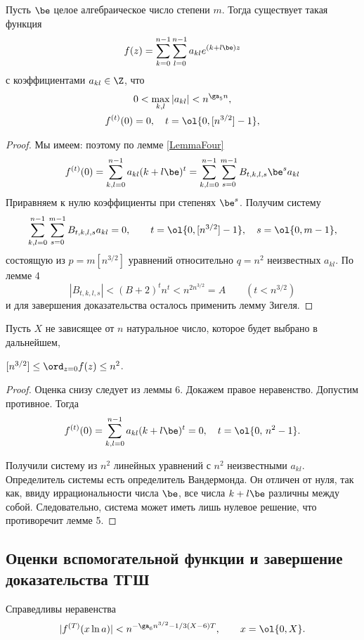 \documentclass{article}
\begin{document}
\begin{lemma}
Пусть $\be$  целое алгебраическое число степени $m$.
Тогда существует такая функция
$$
f(z)=\sum_{k=0}^{n-1} \sum_{l=0}^{n-1} a_{kl} e^{(k+l\be)z}
$$
с коэффициентами $a_{kl} \in \Z$, что
\begin{gather}
0 < \max_{k,l} |a_{kl}| < n^{\ga_5n}, \\
f^{(t)}(0)=0, \quad t= \ol {0,[n^{3/2}]-1},
\end{gather}
\end{lemma}
\begin{proof}
Мы имеем:
поэтому по лемме \ref{LemmaFour}
$$
f^{(t)}(0)=\sum_{k,l=0}^{n-1}a_{kl}(k+l\be)^t=
\sum_{k,l=0}^{n-1}\sum_{s=0}^{m-1}B_{t,k,l,s}\be^sa_{kl}
$$
Приравняем к нулю коэффициенты при степенях $\be^s$. Получим систему
$$
\sum_{k,l=0}^{n-1}\sum_{s=0}^{m-1}B_{t,k,l,s}a_{kl}=0, \qquad
t=\ol{0,[n^{3/2}]-1}, \quad s=\ol{0,m-1},
$$
состоящую из $p=m[n^{3/2}]$   уравнений относительно $q=n^2$
неизвестных $a_{kl}$.  По лемме 4
$$
|B_{t,k,l,s}|<(B+2)^tn^t<n^{2n^{3/2}}=A \qquad (t<n^{3/2})
$$
и для завершения доказательства осталось применить лемму Зигеля.
\end{proof}

Пусть $X$  не зависящее от $n$ натуральное число,
которое будет выбрано в дальнейшем,
\begin{lemma}
$[n^{3/2}] \le \ord_{z=0}f(z) \le n^2$.
\end{lemma}
\begin{proof}
Оценка снизу следует из леммы 6. Докажем правое
неравенство. Допустим противное. Тогда
$$
f^{(t)}(0)=\sum_{k,l=0}^{n-1}a_{kl}(k+l\be)^t= 0, \quad t=\ol {0, \,n^2-1}.
$$

Получили систему из $n^2$ линейных уравнений с $n^2$  неизвестными $a_{kl}$.
Определитель системы есть определитель Вандермонда. Он отличен от нуля,
так как, ввиду иррациональности числа $\be$, все числа $k+l\be$
различны между собой. Следовательно, система может иметь лишь нулевое решение,
что противоречит лемме 5.
\end{proof}

\subsection{Оценки вспомогательной функции и завершение доказательства ТГШ}


\begin{lemma}
Справедливы неравенства
$$
|f^{(T)}(x \ln a)| < n^{-\ga_6n^{3/2}-1/3(X-6)T}, \qquad x=\ol{0,X}.
$$
\end{lemma}
\end{document}
